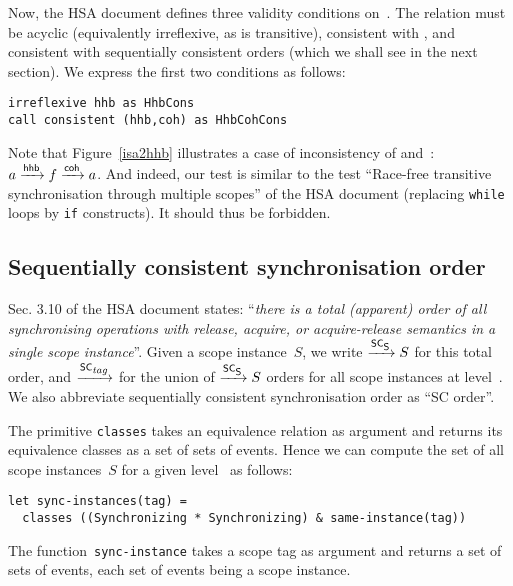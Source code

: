 \documentclass[a4paper]{article}
\begin{document}
Now, the HSA document defines three validity conditions on~\hhb.  The \hhb{}
relation must be acyclic (equivalently irreflexive, as \hhb{} is transitive),
consistent with \coh{}, and consistent with sequentially consistent orders
(which we shall see in the next section).
We express the first two conditions as follows:
\begin{verbatim}
irreflexive hhb as HhbCons
call consistent (hhb,coh) as HhbCohCons
\end{verbatim}
Note that Figure~\ref{isa2hhb} illustrates a case of inconsistency of \hhb{}
and~\coh{}: $a \xrightarrow{\textsf{\scriptsize{}hhb}} f \xrightarrow{\textsf{\scriptsize{}coh}} a$. And indeed, our  test is
similar to the test ``Race-free transitive synchronisation through multiple
scopes'' of the HSA document (replacing \texttt{while} loops by \texttt{if}
constructs). It should thus be forbidden.

\subsection{Sequentially consistent synchronisation order \label{sc-orders}}
Sec. 3.10 of the HSA document states: ``\emph{there is a total (apparent) order
of all synchronising operations with release, acquire, or acquire-release
semantics in a single scope instance}''.  Given a scope instance~$S$, we write
$\xrightarrow{\textsf{\scriptsize{}SC$_{\textsf{\scriptsize{}{\ensuremath{}S}}}$}}{S}$ for this total order, and $\xrightarrow{\textsf{\scriptsize{}SC$_{\textsf{\scriptsize{}{\it\scriptsize{}tag}}}$}}$ for the union of  $\xrightarrow{\textsf{\scriptsize{}SC$_{\textsf{\scriptsize{}{\ensuremath{}S}}}$}}{S}$
orders for all scope instances at level~. We also abbreviate
sequentially consistent synchronisation order as ``SC order''.

The \cat{} primitive \texttt{classes} takes an equivalence relation as argument
and returns its equivalence classes as a set of sets of events. Hence we can
compute the set of all scope instances~$S$ for a given level~
as follows:

\begin{verbatim}
let sync-instances(tag) =
  classes ((Synchronizing * Synchronizing) & same-instance(tag))
\end{verbatim}
The function~\verb+sync-instance+ takes a scope tag as argument and returns
a set of sets of events, each set of events being a scope instance.

\end{document}
